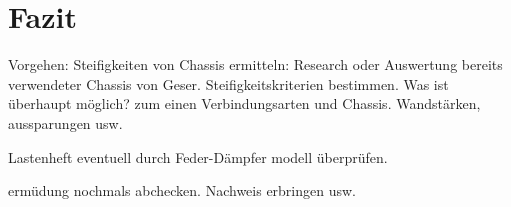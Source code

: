 
\section{Fazit}
\label{Fazit}

Vorgehen:
Steifigkeiten von Chassis ermitteln: Research oder Auswertung bereits verwendeter Chassis von Geser.
Steifigkeitskriterien bestimmen.
Was ist überhaupt möglich? zum einen Verbindungsarten und Chassis. Wandstärken, aussparungen usw.

Lastenheft eventuell durch Feder-Dämpfer modell überprüfen.

ermüdung nochmals abchecken. Nachweis erbringen usw. 
